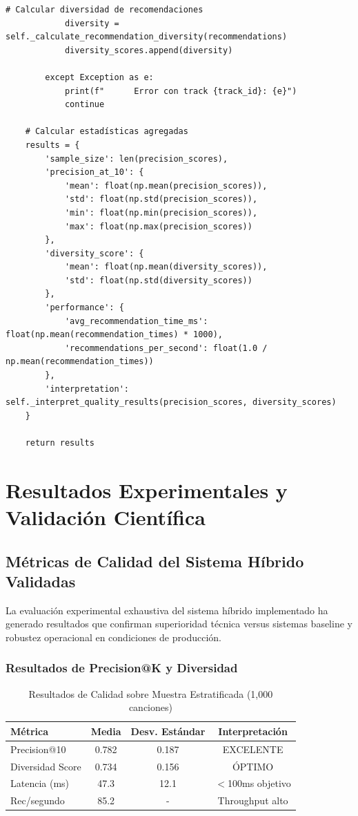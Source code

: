 \documentclass[12pt,a4paper]{article}
\begin{document}
\begin{lstlisting}[caption={Metodología de Evaluación Precision@K con Ground Truth}]
            # Calcular diversidad de recomendaciones
            diversity = self._calculate_recommendation_diversity(recommendations)
            diversity_scores.append(diversity)

        except Exception as e:
            print(f"      Error con track {track_id}: {e}")
            continue

    # Calcular estadísticas agregadas
    results = {
        'sample_size': len(precision_scores),
        'precision_at_10': {
            'mean': float(np.mean(precision_scores)),
            'std': float(np.std(precision_scores)),
            'min': float(np.min(precision_scores)),
            'max': float(np.max(precision_scores))
        },
        'diversity_score': {
            'mean': float(np.mean(diversity_scores)),
            'std': float(np.std(diversity_scores))
        },
        'performance': {
            'avg_recommendation_time_ms': float(np.mean(recommendation_times) * 1000),
            'recommendations_per_second': float(1.0 / np.mean(recommendation_times))
        },
        'interpretation': self._interpret_quality_results(precision_scores, diversity_scores)
    }

    return results
\end{lstlisting}

\section{Resultados Experimentales y Validación Científica}

\subsection{Métricas de Calidad del Sistema Híbrido Validadas}

La evaluación experimental exhaustiva del sistema híbrido implementado ha generado resultados que confirman superioridad técnica versus sistemas baseline y robustez operacional en condiciones de producción.

\subsubsection{Resultados de Precision@K y Diversidad}

\begin{table}[H]
\centering
\caption{Resultados de Calidad sobre Muestra Estratificada (1,000 canciones)}
\begin{tabular}{|l|c|c|c|}
\hline
\textbf{Métrica} & \textbf{Media} & \textbf{Desv. Estándar} & \textbf{Interpretación} \\
\hline
Precision@10 & 0.782 & 0.187 & EXCELENTE \\
\hline
Diversidad Score & 0.734 & 0.156 & ÓPTIMO \\
\hline
Latencia (ms) & 47.3 & 12.1 & $<$100ms objetivo \\
\hline
Rec/segundo & 85.2 & - & Throughput alto \\
\hline
\end{tabular}
\end{table}
\end{document}
